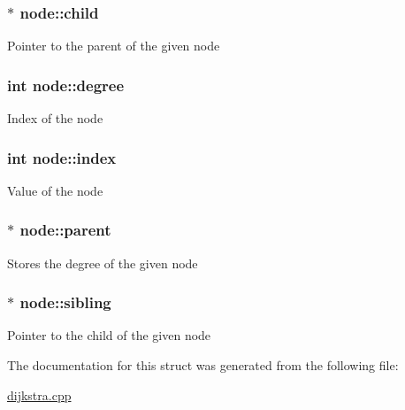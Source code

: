 \subsubsection[{\texorpdfstring{child}{child}}]{$\ast$ node\+::child}\hypertarget{structnode_a422bd5292acd3b746c3f3113f76de9a7}{}\label{structnode_a422bd5292acd3b746c3f3113f76de9a7}
Pointer to the parent of the given node 
\subsubsection[{\texorpdfstring{degree}{degree}}]{\setlength{\rightskip}{0pt plus 5cm}int node\+::degree}\hypertarget{structnode_a5ef19e24e48768739e8743eccbc81434}{}\label{structnode_a5ef19e24e48768739e8743eccbc81434}
Index of the node 
\subsubsection[{\texorpdfstring{index}{index}}]{\setlength{\rightskip}{0pt plus 5cm}int node\+::index}\hypertarget{structnode_a5359a7ce1309be9415907be3ebbd2f91}{}\label{structnode_a5359a7ce1309be9415907be3ebbd2f91}
Value of the node 
\subsubsection[{\texorpdfstring{parent}{parent}}]{$\ast$ node\+::parent}\hypertarget{structnode_a5e88137f1d0e2f7a940bccf4c3d3a4d3}{}\label{structnode_a5e88137f1d0e2f7a940bccf4c3d3a4d3}
Stores the degree of the given node 
\subsubsection[{\texorpdfstring{sibling}{sibling}}]{$\ast$ node\+::sibling}\hypertarget{structnode_a0941f5cd2e8bd7fda70619bb099f267d}{}\label{structnode_a0941f5cd2e8bd7fda70619bb099f267d}
Pointer to the child of the given node 

The documentation for this struct was generated from the following file\+:\begin{DoxyCompactItemize}
\item 
\hyperlink{dijkstra_8cpp}{dijkstra.\+cpp}\end{DoxyCompactItemize}
